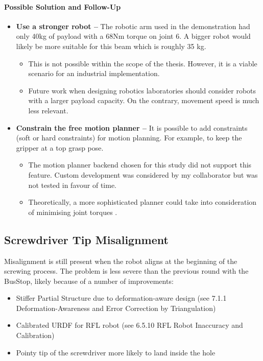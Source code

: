 \paragraph{Possible Solution and Follow-Up}
\begin{itemize}
    \item \textbf{Use a stronger robot --} The robotic arm used in the demonstration had only 40kg of payload with a 68Nm torque on joint 6. A bigger robot would likely be more suitable for this beam which is roughly 35 kg.
    \begin{itemize}
        \item This is not possible within the scope of the thesis. However, it is a viable scenario for an industrial implementation.
        \item Future work when designing robotics laboratories should consider robots with a larger payload capacity. On the contrary, movement speed is much less relevant.
    \end{itemize}
    \item \textbf{Constrain the free motion planner --} It is possible to add constraints (soft or hard constraints) for motion planning. For example, to keep the gripper at a top grasp pose.
    \begin{itemize}
        \item The motion planner backend chosen for this study did not support this feature. Custom development was considered by my collaborator but was not tested in favour of time.
        \item Theoretically, a more sophisticated planner could take into consideration of minimising joint torques \parencite{gargOptimizationTechniquesApplied2002}.
    \end{itemize}
\end{itemize}

\subsection{Screwdriver Tip Misalignment}
Misalignment is still present when the robot aligns at the beginning of the screwing process. The problem is less severe than the previous round with the BusStop, likely because of a number of improvements:
\begin{itemize}
    \item Stiffer Partial Structure due to deformation-aware design (see 7.1.1 Deformation-Awareness and Error Correction by Triangulation)
    \item Calibrated URDF for RFL robot (see 6.5.10 RFL Robot Inaccuracy and Calibration)
    \item Pointy tip of the screwdriver more likely to land inside the hole
\end{itemize}

